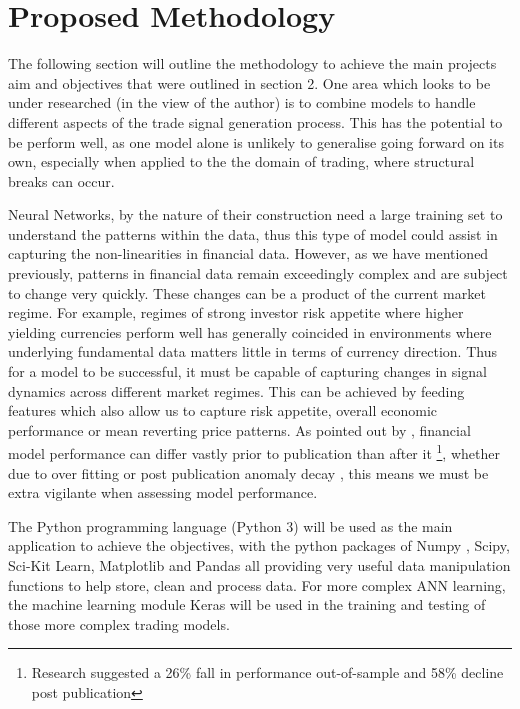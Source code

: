 \documentclass[12pt, a4paper]{article}
\begin{document}
\section{Proposed Methodology}
The following section will outline the methodology to achieve the main projects aim and objectives that were outlined in section 2.
One area which looks to be under researched (in the view of the author) is to combine models to handle different aspects of the trade signal generation process. This has the potential to be perform well, as one model alone is unlikely to generalise going forward on its own, especially when applied to the the domain of trading, where structural breaks can occur. \par Neural Networks, by the nature of their construction need a large training set to understand the patterns within the data, thus this type of model could assist in capturing the non-linearities in financial data. \newline However, as we have mentioned previously, patterns in financial data remain exceedingly complex and are subject to change very quickly. These changes can be a product of the current market regime. For example, regimes of strong investor risk appetite where higher yielding currencies perform well \cite{Christiansen2011} has generally coincided in environments where underlying fundamental data matters little in terms of currency direction. \newline Thus for a model to be successful, it must be capable of capturing changes in signal dynamics across different market regimes. This can be achieved by feeding features which also allow us to capture risk appetite, overall economic performance or mean reverting price patterns. 
\newline As pointed out by \cite{Mclean2016}, financial model performance can differ vastly prior to publication than after it \footnote{Research suggested a 26\% fall in performance out-of-sample and 58\% decline post publication}, whether due to over fitting or post publication anomaly decay \cite{Bartram2019}, this means we must be extra vigilante when assessing model performance.
\par The Python programming language (Python 3) \cite{McKinney1976} will be used as the main application to achieve the objectives, with the python packages of Numpy \cite{VanDerWalt2011}, Scipy\cite{Tobergte2013}, Sci-Kit Learn\cite{Geron2017}, Matplotlib\cite{Wood2015} and Pandas\cite{Reiff2002} all providing very useful data manipulation functions to help store, clean and process data. For more complex ANN learning, the machine learning module Keras \cite{Chollet2015} will be used in the training and testing of those more complex trading models.
\end{document}
